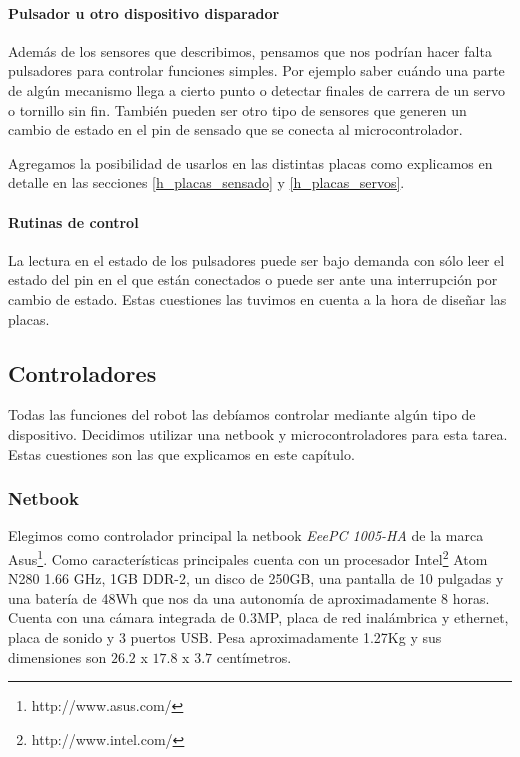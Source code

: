 \paragraph{Pulsador u otro dispositivo disparador}
\label{h_sensado_pulsador}

Adem\'as de los sensores que describimos, pensamos que nos podr\'ian hacer falta pulsadores para controlar funciones
simples.
Por ejemplo saber cu\'ando una parte de alg\'un mecanismo llega a cierto punto o detectar finales de carrera
de un servo o tornillo sin fin.
Tambi\'en pueden ser otro tipo de sensores que generen un cambio de estado en el pin de sensado que se conecta al
microcontrolador.

Agregamos la posibilidad de usarlos en las distintas placas como explicamos en detalle en las secciones
\ref{h_placas_sensado} y \ref{h_placas_servos}.

\paragraph{Rutinas de control}
\label{h_sensado_pulsador_rutinas}

La lectura en el estado de los pulsadores puede ser bajo demanda con s\'olo leer el estado del pin en el que est\'an
conectados o puede ser ante una interrupci\'on por cambio de estado.
Estas cuestiones las tuvimos en cuenta a la hora de dise\~nar las placas.

\subsection{Controladores}
\label{h_controlador}

Todas las funciones del robot las deb\'iamos controlar mediante alg\'un tipo de dispositivo.
Decidimos utilizar una netbook y microcontroladores para esta tarea.
Estas cuestiones son las que explicamos en este cap\'itulo.

\subsubsection{Netbook}
\label{h_controlador_netbook}

Elegimos como controlador principal la netbook \emph{EeePC 1005-HA} de la marca Asus\footnote{http://www.asus.com/}.
Como caracter\'isticas principales cuenta con un procesador Intel\footnote{http://www.intel.com/} Atom N280 1.66 GHz,
1GB DDR-2, un disco de 250GB, una pantalla de 10 pulgadas y una bater\'ia de 48Wh que nos da una autonom\'ia de 
aproximadamente 8 horas.
Cuenta con una c\'amara integrada de 0.3MP, placa de red inal\'ambrica y ethernet, placa de sonido y 3 puertos USB.
Pesa aproximadamente 1.27Kg y sus dimensiones son $26.2$ x $17.8$ x $3.7$ cent\'imetros.

